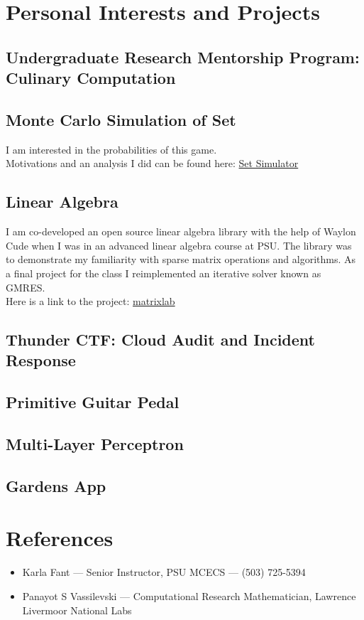 \documentclass{article}
\begin{document}
\section{Personal Interests and Projects}

\subsection{Undergraduate Research Mentorship Program: Culinary Computation}

\subsection{Monte Carlo Simulation of Set\tiny\mdseries\textregistered}
I am interested in the probabilities of this game.\\
Motivations and an analysis I did can be found here:
\href{https://www.github.com/aujxn/set_game_simulator}{Set Simulator}

\subsection{Linear Algebra}
I am co-developed an open source linear algebra library with the help
of Waylon Cude when I was in an advanced linear algebra course at PSU.
The library was to demonstrate my familiarity with sparse matrix operations and algorithms.
As a final project for the class I reimplemented an iterative solver known as GMRES.\\
Here is a link to the project: \href{https://www.gitlab.com/AustenN/matrixlab}{matrixlab}

\subsection{Thunder CTF: Cloud Audit and Incident Response}

\subsection{Primitive Guitar Pedal}

\subsection{Multi-Layer Perceptron}

\subsection{Gardens App}

\section{References}
\begin{itemize}
\item Karla Fant --- Senior Instructor, PSU MCECS --- (503) 725-5394
\item Panayot S Vassilevski --- Computational Research Mathematician, Lawrence Livermoor National Labs
\end{itemize}
\end{document}
